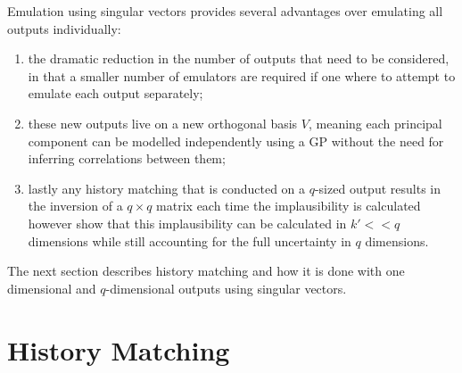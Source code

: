 \documentclass{article}
\newcommand{\numOutputs}{q}
\newcommand{\basis}{V}
\newcommand{\matRank}{k}
\begin{document}
Emulation using singular vectors provides several advantages over emulating all outputs individually:
\begin{enumerate}
    \item the dramatic reduction in the number of outputs that need to be considered, in that a smaller number of emulators are required if one where to attempt to emulate each output separately;

    \item these new outputs live on a new orthogonal basis $\basis$, meaning each principal component can be modelled independently using a GP \citep{Higdon2008} without the need for inferring correlations between them;

    \item lastly any history matching that is conducted on a $\numOutputs$-sized output results in the inversion of a $\numOutputs \times \numOutputs$ matrix each time the implausibility is calculated however \citet{Salter2022} show that this implausibility can be calculated in $\matRank' << \numOutputs$ dimensions while still accounting for the full uncertainty in $\numOutputs$ dimensions.
\end{enumerate}
The next section describes history matching and how it is done with one dimensional and $\numOutputs$-dimensional outputs using singular vectors.
\section{History Matching}
\label{section:hm}
\end{document}
